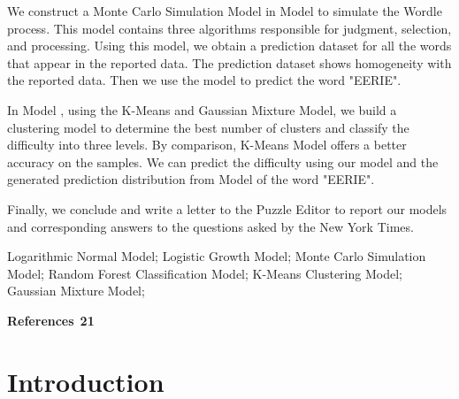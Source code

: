 \documentclass[12pt]{article}
\begin{document}
\vspace{0.3cm}
\noindent
We construct a Monte Carlo Simulation Model in Model \uppercase\expandafter{} to simulate the Wordle process. This model contains three algorithms responsible for judgment, selection, and processing. Using this model, we obtain a prediction dataset for all the words that appear in the reported data. The prediction dataset shows homogeneity with the reported data. Then we use the model to predict the word "EERIE".

\vspace{0.3cm}
\noindent
In Model \uppercase\expandafter{}, using the K-Means and Gaussian Mixture Model, we build a clustering model to determine the best number of clusters and classify the difficulty into three levels. By comparison, K-Means Model offers a better accuracy on the samples. We can predict the difficulty using our model and the generated prediction distribution from Model \uppercase\expandafter{} of the word "EERIE".

\vspace{0.3cm}
\noindent
Finally, we conclude and write a letter to the Puzzle Editor to report our models and corresponding answers to the questions asked by the New York Times.

\vspace{0.3cm}
\noindent
\begin{keywords}
Logarithmic Normal Model; Logistic Growth Model; Monte Carlo Simulation Model; Random Forest Classification Model; K-Means Clustering Model; Gaussian Mixture Model;
\end{keywords}

\clearpage
\pagestyle{fancy}
\newpage
\setcounter{page}{1}

\tableofcontents
\vspace{0.3cm}
\noindent
\textbf{References\quad\quad\quad\quad\quad\quad\quad\quad\quad\quad\quad\quad\quad\quad\quad\quad\quad\quad\quad\quad\quad\quad\quad\quad\quad\quad\quad\quad\quad\quad\quad\quad\quad\quad\;\;\,\,\,21}
\newpage

\section{Introduction}
\end{document}
